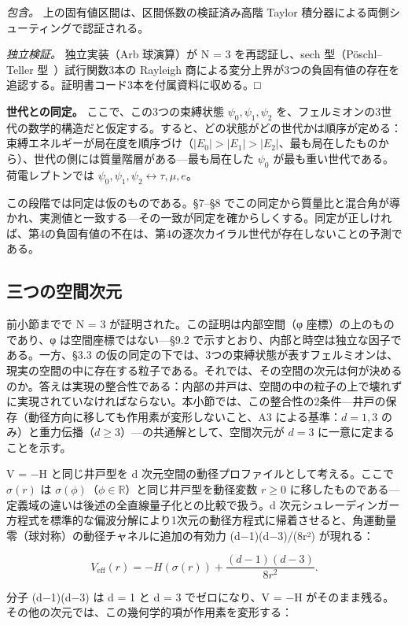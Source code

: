 \documentclass[fontsize=11pt,paper=a4,lualatex]{jlreq}
\begin{document}
\emph{包含。} 上の固有値区間は、区間係数の検証済み高階 Taylor 積分器による両側シューティングで認証される。

\emph{独立検証。} 独立実装（Arb 球演算）が N = 3 を再認証し、sech 型（Pöschl--Teller 型~\cite{poschl}）試行関数3本の Rayleigh 商による変分上界が3つの負固有値の存在を追認する。証明書コード3本を付属資料に収める。□

\textbf{世代との同定。} ここで、この3つの束縛状態 $\psi_0, \psi_1, \psi_2$ を、フェルミオンの3世代の数学的構造だと仮定する。すると、どの状態がどの世代かは順序が定める：束縛エネルギーが局在度を順序づけ（$|E_0| > |E_1| > |E_2|$、最も局在したものから）、世代の側には質量階層がある---最も局在した $\psi_0$ が最も重い世代である。荷電レプトンでは $\psi_0, \psi_1, \psi_2 \leftrightarrow \tau, \mu, e$。

この段階では同定は仮のものである。§7--§8 でこの同定から質量比と混合角が導かれ、実測値と一致する---その一致が同定を確からしくする。同定が正しければ、第4の負固有値の不在は、第4の逐次カイラル世代が存在しないことの予測である。

\subsection{三つの空間次元}\label{ux3064ux306eux7a7aux9593ux6b21ux5143}

前小節までで N = 3 が証明された。この証明は内部空間（φ 座標）の上のものであり、φ は空間座標ではない---§9.2 で示すとおり、内部と時空は独立な因子である。一方、§3.3 の仮の同定の下では、3つの束縛状態が表すフェルミオンは、現実の空間の中に存在する粒子である。それでは、その空間の次元は何が決めるのか。答えは実現の整合性である：内部の井戸は、空間の中の粒子の上で壊れずに実現されていなければならない。本小節では、この整合性の2条件---井戸の保存（動径方向に移しても作用素が変形しないこと、A3 による基準：$d = 1, 3$ のみ）と重力伝播（$d \ge 3$）---の共通解として、空間次元が $d = 3$ に一意に定まることを示す。

V = −H と同じ井戸型を d 次元空間の動径プロファイルとして考える。ここで $\sigma(r)$ は $\sigma(\phi)$（$\phi \in \mathbb{R}$）と同じ井戸型を動径変数 $r \geq 0$ に移したものである---定義域の違いは後述の全直線量子化との比較で扱う。d 次元シュレーディンガー方程式を標準的な偏波分解により1次元の動径方程式に帰着させると、角運動量零（球対称）の動径チャネルに追加の有効力 (d−1)(d−3)/(8r²) が現れる：

\[V_\mathrm{eff}(r) = -H(\sigma(r)) + \frac{(d-1)(d-3)}{8r^2}.\]

分子 (d−1)(d−3) は d = 1 と d = 3 でゼロになり、V = −H
がそのまま残る。その他の次元では、この幾何学的項が作用素を変形する：
\end{document}
